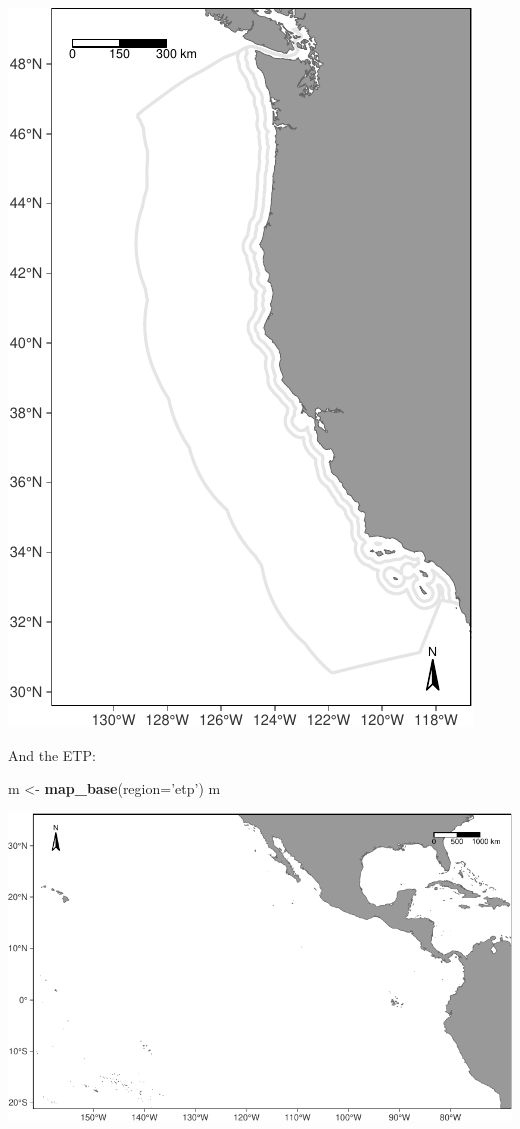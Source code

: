 \documentclass[
]{book}
\newenvironment{Shaded}{\begin{snugshade}}{\end{snugshade}}
\newcommand{\DataTypeTok}[1]{\textcolor[rgb]{0.13,0.29,0.53}{#1}}
\newcommand{\KeywordTok}[1]{\textcolor[rgb]{0.13,0.29,0.53}{\textbf{#1}}}
\newcommand{\NormalTok}[1]{#1}
\newcommand{\StringTok}[1]{\textcolor[rgb]{0.31,0.60,0.02}{#1}}
\begin{document}
\includegraphics{figures/unnamed-chunk-51-1.pdf}

And the ETP:

\begin{Shaded}
\begin{Highlighting}[]
\NormalTok{m <-}\StringTok{ }\KeywordTok{map_base}\NormalTok{(}\DataTypeTok{region=}\StringTok{'etp'}\NormalTok{)}
\NormalTok{m}
\end{Highlighting}
\end{Shaded}

\includegraphics{figures/unnamed-chunk-52-1.pdf}
\end{document}
